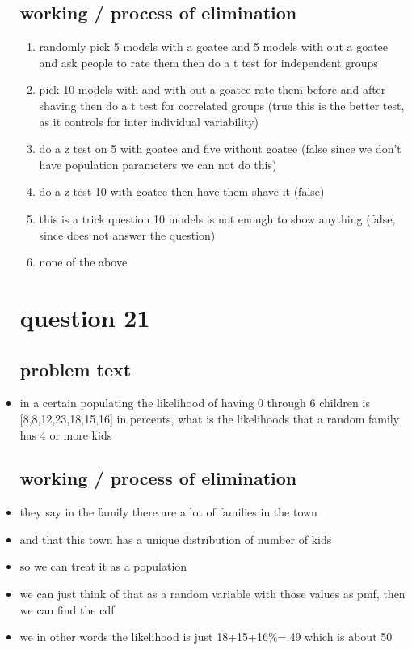 \documentclass{article}
\begin{document}
\begin{itemize}
\subsection{working / process of elimination }
\begin{enumerate}
    \item randomly pick 5 models with a goatee and 5 models with out a goatee and ask people to rate them then do a t test for independent groups 
    \item pick 10 models with and with out a goatee rate them before and after shaving then do a t test for correlated groups (true this is the better test, as it controls for inter individual variability) 
    \item do a z test on 5 with goatee and five without goatee (false since we don't have population parameters we can not do this)
    \item do a z test 10 with goatee then have them shave it (false)
    \item this is a trick question 10 models is not enough to show anything (false, since does not answer the question) 
    \item none of the above 
\end{enumerate}
\section{question 21}
\subsection{problem text}
\item in a certain populating the likelihood of having 0 through 6 children is [8,8,12,23,18,15,16] in percents, what is the likelihoods that a random family has 4 or more kids
\subsection{working / process of elimination }
\item they say in the family there are a lot of families in the town 
\item and that this town has a unique distribution of number of kids
\item so we can treat it as a population
\item we can just think of that as a random variable with those values as pmf, then we can find the cdf.
\item we in other words the likelihood is just 18+15+16\%=.49 which is about 50 



\end{itemize}
\end{document}
